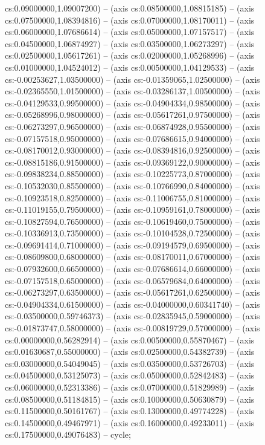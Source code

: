 cs:0.09000000,1.09007200) -- (axis cs:0.08500000,1.08815185) -- (axis cs:0.07500000,1.08394816) -- (axis cs:0.07000000,1.08170011) -- (axis cs:0.06000000,1.07686614) -- (axis cs:0.05000000,1.07157517) -- (axis cs:0.04500000,1.06874927) -- (axis cs:0.03500000,1.06273297) -- (axis cs:0.02500000,1.05617261) -- (axis cs:0.02000000,1.05268996) -- (axis cs:0.01000000,1.04524012) -- (axis cs:0.00500000,1.04129533) -- (axis cs:-0.00253627,1.03500000) -- (axis cs:-0.01359065,1.02500000) -- (axis cs:-0.02365550,1.01500000) -- (axis cs:-0.03286137,1.00500000) -- (axis cs:-0.04129533,0.99500000) -- (axis cs:-0.04904334,0.98500000) -- (axis cs:-0.05268996,0.98000000) -- (axis cs:-0.05617261,0.97500000) -- (axis cs:-0.06273297,0.96500000) -- (axis cs:-0.06874928,0.95500000) -- (axis cs:-0.07157518,0.95000000) -- (axis cs:-0.07686615,0.94000000) -- (axis cs:-0.08170012,0.93000000) -- (axis cs:-0.08394816,0.92500000) -- (axis cs:-0.08815186,0.91500000) -- (axis cs:-0.09369122,0.90000000) -- (axis cs:-0.09838234,0.88500000) -- (axis cs:-0.10225773,0.87000000) -- (axis cs:-0.10532030,0.85500000) -- (axis cs:-0.10766990,0.84000000) -- (axis cs:-0.10923518,0.82500000) -- (axis cs:-0.11006755,0.81000000) -- (axis cs:-0.11019155,0.79500000) -- (axis cs:-0.10959161,0.78000000) -- (axis cs:-0.10827594,0.76500000) -- (axis cs:-0.10619460,0.75000000) -- (axis cs:-0.10336913,0.73500000) -- (axis cs:-0.10104528,0.72500000) -- (axis cs:-0.09691414,0.71000000) -- (axis cs:-0.09194579,0.69500000) -- (axis cs:-0.08609800,0.68000000) -- (axis cs:-0.08170011,0.67000000) -- (axis cs:-0.07932600,0.66500000) -- (axis cs:-0.07686614,0.66000000) -- (axis cs:-0.07157518,0.65000000) -- (axis cs:-0.06579684,0.64000000) -- (axis cs:-0.06273297,0.63500000) -- (axis cs:-0.05617261,0.62500000) -- (axis cs:-0.04904334,0.61500000) -- (axis cs:-0.04000000,0.60341740) -- (axis cs:-0.03500000,0.59746373) -- (axis cs:-0.02835945,0.59000000) -- (axis cs:-0.01873747,0.58000000) -- (axis cs:-0.00819729,0.57000000) -- (axis cs:0.00000000,0.56282914) -- (axis cs:0.00500000,0.55870467) -- (axis cs:0.01630687,0.55000000) -- (axis cs:0.02500000,0.54382739) -- (axis cs:0.03000000,0.54049045) -- (axis cs:0.03500000,0.53726703) -- (axis cs:0.04500000,0.53125073) -- (axis cs:0.05000000,0.52842483) -- (axis cs:0.06000000,0.52313386) -- (axis cs:0.07000000,0.51829989) -- (axis cs:0.08500000,0.51184815) -- (axis cs:0.10000000,0.50630879) -- (axis cs:0.11500000,0.50161767) -- (axis cs:0.13000000,0.49774228) -- (axis cs:0.14500000,0.49467971) -- (axis cs:0.16000000,0.49233011) -- (axis cs:0.17500000,0.49076483) -- cycle;
